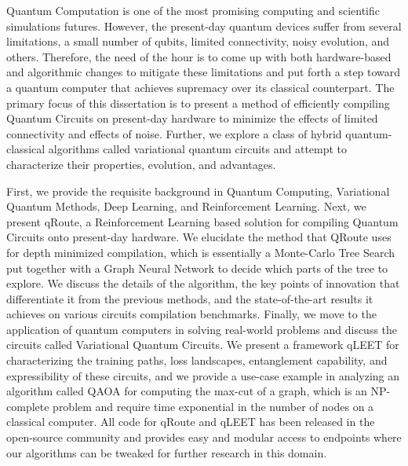 Quantum Computation is one of the most promising computing and scientific simulations futures. However, the present-day quantum devices suffer from several limitations, a small number of qubits, limited connectivity, noisy evolution, and others. Therefore, the need of the hour is to come up with both hardware-based and algorithmic changes to mitigate these limitations and put forth a step toward a quantum computer that achieves supremacy over its classical counterpart. The primary focus of this dissertation is to present a method of efficiently compiling Quantum Circuits on present-day hardware to minimize the effects of limited connectivity and effects of noise. Further, we explore a class of hybrid quantum-classical algorithms called variational quantum circuits and attempt to characterize their properties, evolution, and advantages. 

First, we provide the requisite background in Quantum Computing, Variational Quantum Methods, Deep Learning, and Reinforcement Learning. Next, we present qRoute, a Reinforcement Learning based solution for compiling Quantum Circuits onto present-day hardware. We elucidate the method that QRoute uses for depth minimized compilation, which is essentially a Monte-Carlo Tree Search put together with a Graph Neural Network to decide which parts of the tree to explore. We discuss the details of the algorithm, the key points of innovation that differentiate it from the previous methods, and the state-of-the-art results it achieves on various circuits compilation benchmarks. Finally, we move to the application of quantum computers in solving real-world problems and discuss the circuits called Variational Quantum Circuits. We present a framework qLEET for characterizing the training paths, loss landscapes, entanglement capability, and expressibility of these circuits, and we provide a use-case example in analyzing an algorithm called QAOA for computing the max-cut of a graph, which is an NP-complete problem and require time exponential in the number of nodes on a classical computer. All code for qRoute and qLEET has been released in the open-source community and provides easy and modular access to endpoints where our algorithms can be tweaked for further research in this domain.
